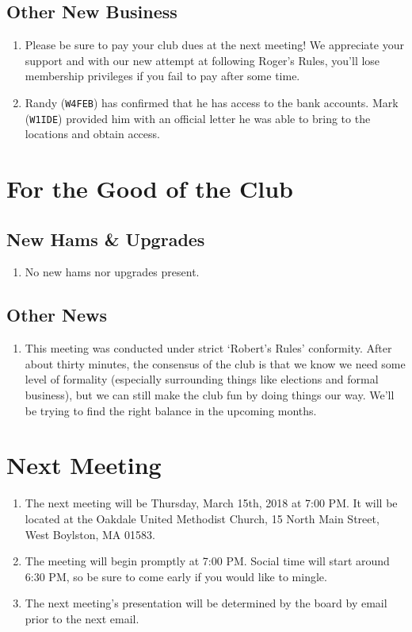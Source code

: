 \documentclass[10pt,letterpaper]{article}
\begin{document}
\subsection{Other New Business}
\begin{enumerate}
  \item Please be sure to pay your club dues at the next meeting! We appreciate your support and with our new attempt at following Roger's Rules, you'll lose membership privileges if you fail to pay after some time.
  \item Randy (\texttt{W4FEB}) has confirmed that he has access to the bank accounts. Mark (\texttt{W1IDE}) provided him with an official letter he was able to bring to the locations and obtain access.
\end{enumerate}

\section{For the Good of the Club}

\subsection{New Hams \& Upgrades}
\begin{enumerate}
  \item No new hams nor upgrades present.
\end{enumerate}

\subsection{Other News}
\begin{enumerate}
  \item This meeting was conducted under strict `Robert's Rules' conformity. After about thirty minutes, the consensus of the club is that we know we need some level of formality (especially surrounding things like elections and formal business), but we can still make the club fun by doing things our way. We'll be trying to find the right balance in the upcoming months.
\end{enumerate}

\section{Next Meeting}
\begin{enumerate}
  \item The next meeting will be Thursday, March 15th, 2018 at 7:00 PM. It will be located at the Oakdale United Methodist Church, 15 North Main Street, West Boylston, MA 01583.
  \item The meeting will begin promptly at 7:00 PM. Social time will start around 6:30 PM, so be sure to come early if you would like to mingle.
  \item The next meeting's presentation will be determined by the board by email prior to the next email.
\end{enumerate}
\end{document}
